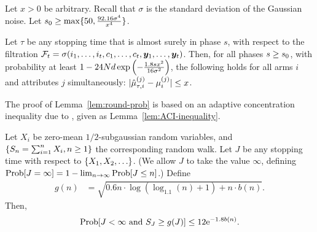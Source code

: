 \begin{lemma} \label{lem:round-prob}
Let $x > 0$ be arbitrary.
Recall that $\sigma$ is the standard deviation of the Gaussian noise.
Let $s_0 \geq \max \{ 50, \frac{92.16 \sigma^4}{x^4} \}$.

Let $\tau$ be any stopping time that is almost surely  in phase $s$,
with respect to the filtration
$\mathcal{F}_{t} = \sigma (i_{1}, \ldots, i_{t},
                          c_{1}, \ldots, c_{t},
                          \bm{y}_{1}, \ldots, \bm{y}_{t})$.
Then, for all phases $s \geq s_0$,
with probability at least 
$1- 24 N d \exp\left(-\frac{1.8 s x^2}{16 \sigma^2} \right)$,
the following holds for all arms $i$ and attributes $j$
simultaneously:
$|\hat{\mu}_{\tau,i}^{(j)} - \mu_{i}^{(j)}| \leq x$.
\end{lemma}

The proof of Lemma~\ref{lem:round-prob} is based on an adaptive
concentration inequality due to \cite{zhao2016adaptive},
given as Lemma~\ref{lem:ACI-inequality}.

\begin{lemma}
\label{lem:ACI-inequality}
Let $X_i$ be zero-mean $1/2$-subgaussian random variables,
and $\{ S_n = \sum_{i=1}^n X_i, n \geq 1 \}$ the corresponding random walk.
Let $J$ be any stopping time with respect to $\{ X_1, X_2, \ldots \}$.
(We allow $J$ to take the value $\infty$,
defining $\Prob{J = \infty} = 1 - \lim_{n \to \infty} \Prob{J \leq n}$.)
Define 
\begin{align*}
g(n) & = \sqrt{0.6 n \cdot \log (\log_{1.1}(n) + 1) + n \cdot b(n)}.
\end{align*}
Then, 
\begin{align*}
\Prob{J < \infty \mbox{ and } S_J \geq g(J)} \leq 12 \e^{-1.8 b(n)}.
\end{align*}
\end{lemma}


